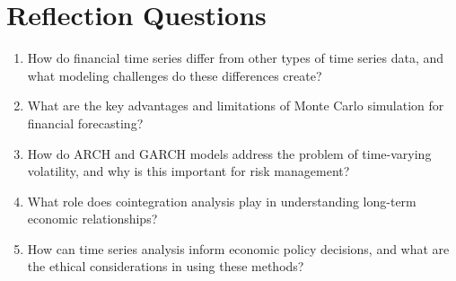 \section*{Reflection Questions}

\begin{enumerate}
\item How do financial time series differ from other types of time series data, and what modeling challenges do these differences create?

\item What are the key advantages and limitations of Monte Carlo simulation for financial forecasting?

\item How do ARCH and GARCH models address the problem of time-varying volatility, and why is this important for risk management?

\item What role does cointegration analysis play in understanding long-term economic relationships?

\item How can time series analysis inform economic policy decisions, and what are the ethical considerations in using these methods?
\end{enumerate}

